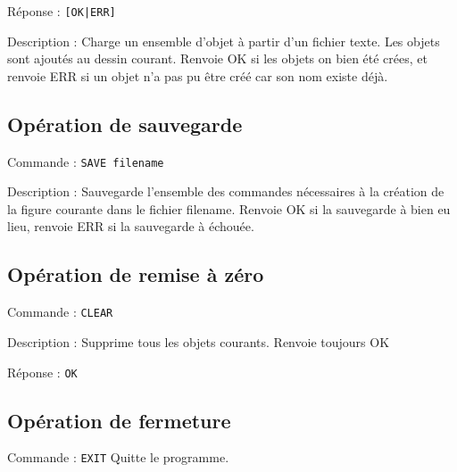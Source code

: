 \documentclass[11pt]{article}
\begin{document}
Réponse : \texttt{[OK|ERR]}

Description : Charge un ensemble d'objet à partir d'un fichier texte. Les objets sont ajoutés au dessin courant. Renvoie OK si les objets on bien été crées, et renvoie ERR si un objet n'a pas pu être créé car son nom existe déjà.

\subsection{Opération de sauvegarde}
Commande : \texttt{SAVE filename}

Description : Sauvegarde l'ensemble des commandes nécessaires à la création de la figure courante dans le fichier filename. Renvoie OK si la sauvegarde à bien eu lieu, renvoie ERR si la sauvegarde à échouée.

\subsection{Opération de remise à zéro}
Commande : \texttt{CLEAR}

Description : Supprime tous les objets courants. Renvoie toujours OK

Réponse : \texttt{OK}
\subsection{Opération de fermeture}
Commande : \texttt{EXIT}
Quitte le programme.
\end{document}
